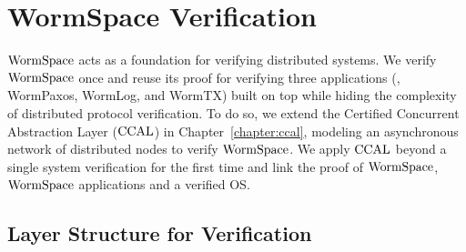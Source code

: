 \section{WormSpace Verification}
\label{sec:formal_verification}


$\mathrm{WormSpace}$ acts as a foundation for verifying distributed systems. 
We verify $\mathrm{WormSpace}$ once and reuse its proof for verifying three applications (\ie, WormPaxos, WormLog, and WormTX)
built on top while hiding the complexity of distributed protocol verification.     
To do so, we extend the Certified Concurrent Abstraction Layer ($\mathrm{CCAL}$)  in Chapter~\ref{chapter:ccal}, 
modeling an asynchronous network of distributed nodes to verify $\mathrm{WormSpace}$. 
We apply $\mathrm{CCAL}$ beyond a single system verification for the first time and link the proof of $\mathrm{WormSpace}$, 
$\mathrm{WormSpace}$ applications and a verified OS. 

\subsection{Layer Structure for Verification}

